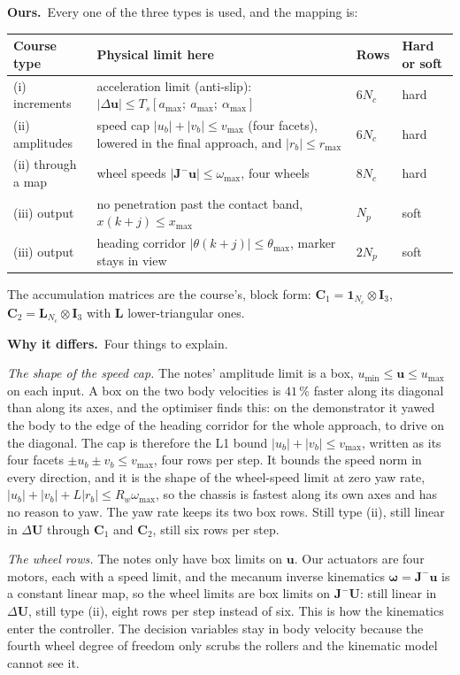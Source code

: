 \documentclass[11pt,a4paper]{article}
\newcommand{\vect}[1]{\bm{#1}}
\newcommand{\mat}[1]{\bm{#1}}
\newcommand{\dU}{\Delta\vect{U}}
\newcommand{\du}{\Delta\vect{u}}
\newcommand{\Ts}{T_s}
\newcommand{\Np}{N_p}
\newcommand{\Nc}{N_c}
\newcommand{\ones}{\vect{1}}
\newcommand{\ours}{\textbf{\textcolor{green!45!black}{Ours.}}\ }
\newcommand{\why}{\textbf{\textcolor{red!60!black}{Why it differs.}}\ }
\begin{document}
\ours Every one of the three types is used, and the mapping is:
\begin{center}
\small
\begin{tabularx}{\linewidth}{l X l l}
\toprule
Course type & Physical limit here & Rows & Hard or soft \\
\midrule
(i) increments & acceleration limit (anti-slip): $|\du|\le\Ts[a_{\max};\ a_{\max};\ \alpha_{\max}]$ & $6\Nc$ & hard \\
(ii) amplitudes & speed cap $|u_b|+|v_b|\le v_{\max}$ (four facets), lowered in the final approach, and $|r_b|\le r_{\max}$ & $6\Nc$ & hard \\
(ii) through a map & wheel speeds $|\mat J^{-}\vect u|\le\omega_{\max}$, four wheels & $8\Nc$ & hard \\
(iii) output & no penetration past the contact band, $x(k+j)\le x_{\max}$ & $\Np$ & soft \\
(iii) output & heading corridor $|\theta(k+j)|\le\theta_{\max}$, marker stays in view & $2\Np$ & soft \\
\bottomrule
\end{tabularx}
\end{center}
The accumulation matrices are the course's, block form: $\mat C_1 = \ones_{\Nc}\otimes\mat I_3$, $\mat C_2 = \mat L_{\Nc}\otimes\mat I_3$ with $\mat L$ lower-triangular ones.

\why Four things to explain.

\emph{The shape of the speed cap.} The notes' amplitude limit is a box, $u_{\min}\le\vect u\le u_{\max}$ on each input. A box on the two body velocities is $41\,\%$ faster along its diagonal than along its axes, and the optimiser finds this: on the demonstrator it yawed the body to the edge of the heading corridor for the whole approach, to drive on the diagonal. The cap is therefore the L1 bound $|u_b|+|v_b|\le v_{\max}$, written as its four facets $\pm u_b\pm v_b\le v_{\max}$, four rows per step. It bounds the speed norm in every direction, and it is the shape of the wheel-speed limit at zero yaw rate, $|u_b|+|v_b|+L|r_b|\le R_w\omega_{\max}$, so the chassis is fastest along its own axes and has no reason to yaw. The yaw rate keeps its two box rows. Still type (ii), still linear in $\dU$ through $\mat C_1$ and $\mat C_2$, still six rows per step.

\emph{The wheel rows.} The notes only have box limits on $\vect u$. Our actuators are four motors, each with a speed limit, and the mecanum inverse kinematics $\vect\omega = \mat J^{-}\vect u$ is a constant linear map, so the wheel limits are box limits on $\mat J^{-}\vect U$: still linear in $\dU$, still type (ii), eight rows per step instead of six. This is how the kinematics enter the controller. The decision variables stay in body velocity because the fourth wheel degree of freedom only scrubs the rollers and the kinematic model cannot see it.
\end{document}
